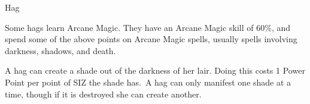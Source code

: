 \begin{monsterbox}{Hag}
\begin{rpg-monsteraction}
	\end{rpg-monsteraction}
	\begin{rpg-monsteraction}
		Some hags learn Arcane Magic. They have an Arcane Magic skill of 60\%, and spend some of the above points on Arcane Magic spells, usually spells involving darkness, shadows, and death.
	\end{rpg-monsteraction}
	\begin{rpg-monsteraction}
		A hag can create a shade out of the darkness of her lair. Doing this costs 1 Power Point per point of SIZ the shade has. A hag can only manifest one shade at a time, though if it is destroyed she can create another.
	\end{rpg-monsteraction}

\end{monsterbox}


